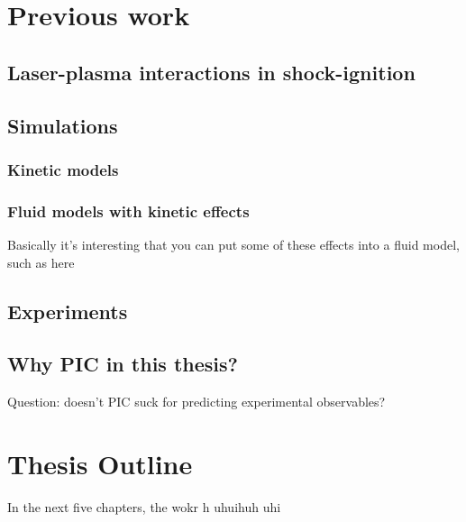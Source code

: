 \section{Previous work}
\subsection{Laser-plasma interactions in shock-ignition}
\subsection{Simulations}
\subsubsection{Kinetic models}
\subsubsection{Fluid models with kinetic effects}
Basically it's interesting that you can put some of these effects into a fluid model, such as here \citep{Tran2020}
\subsection{Experiments}

\subsection{Why PIC in this thesis?}
Question: doesn't PIC suck for predicting experimental observables? 

\section{Thesis Outline}
In the next five chapters, the wokr h uhuihuh uhi 

